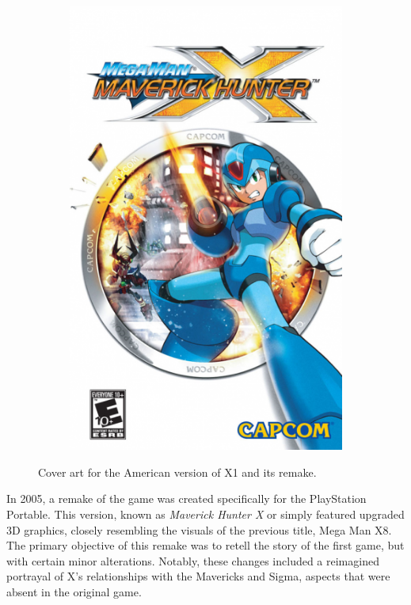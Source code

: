 \begin{figure}[htp]
\begin{subfigure}[c]{0.4\linewidth}
		\includegraphics[width=\linewidth]{figures/X1/mmxmh.png}
	\end{subfigure}
	\caption{Cover art for the American version of X1 and its remake.}
\end{figure}
In 2005, a remake of the game was created specifically for the PlayStation Portable. This version, known as \textit{Maverick Hunter X} or simply \mhx featured upgraded 3D graphics, closely resembling the visuals of the previous title, Mega Man X8. The primary objective of this remake was to retell the story of the first game, but with certain minor alterations. Notably, these changes included a reimagined portrayal of X's relationships with the Mavericks and Sigma, aspects that were absent in the original game.

